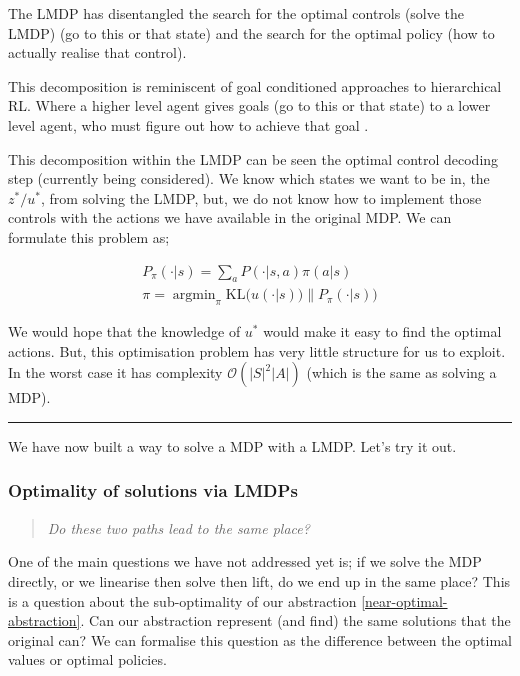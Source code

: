 The LMDP has disentangled the search for the optimal controls (solve the LMDP) (go to this or
that state) and the search for the optimal policy (how to actually
realise that control).

This decomposition is reminiscent of goal conditioned approaches to hierarchical RL.
Where a higher level agent gives goals (go to this or that state) to a lower level
agent, who must figure out how to achieve that goal \cite{Vezhnevets2017}.

This decomposition within the LMDP can be seen the optimal control decoding
step (currently being considered). We know which
states we want to be in, the $z^{* } / u^{* }$, from solving the LMDP, but,
we do not know how to implement those controls with the actions we have available in the original MDP.
We can formulate this problem as;

\begin{align}
P_{\pi}(\cdot | s) = \sum_a P(\cdot | s, a) \pi(a | s) \\
\pi = \mathop{\text{argmin}}_{\pi} \text{KL}\Big(u(\cdot | s))\parallel P_{\pi}(\cdot | s)\Big)
\end{align}

We would hope that the knowledge of $u^{* }$ would make it easy to find the optimal actions.
But, this optimisation problem has very little structure for us to exploit.
In the worst case it has complexity $\mathcal O(|S|^2|A|)$ (which is the same as solving a MDP).

\begin{center}\rule{0.5\linewidth}{\linethickness}\end{center}

We have now built a way to solve a MDP with a LMDP. Let's try it out.

\subsubsection{Optimality of solutions via LMDPs}

\begin{quote}
\textsl{Do these two paths lead to the same place?}
\end{quote}

One of the main questions we have not addressed yet is; if we solve the
MDP directly, or we linearise then solve then lift, do we end up in the same
place? This is a question about the sub-optimality of our abstraction \ref{near-optimal-abstraction}. Can
our abstraction represent (and find) the same solutions that the
original can? We can formalise this question as the difference between the optimal values or optimal policies.

